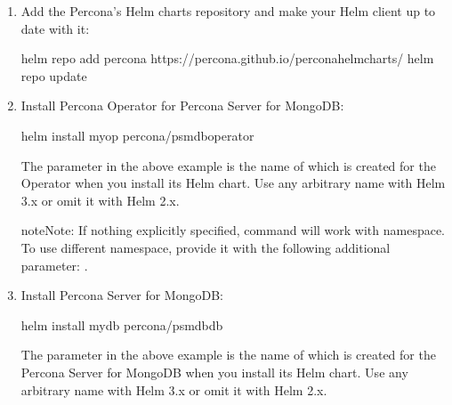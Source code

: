\documentclass[letterpaper,10pt,english]{sphinxmanual}
\begin{document}
\label{\detokenize{helm:installation}}\begin{enumerate}
%
\item {} 
Add the Percona’s Helm charts repository and make your Helm client up to
date with it:

\begin{sphinxVerbatim}[commandchars=\\\{\}]
helm repo add percona https://percona.github.io/percona\PYGZhy{}helm\PYGZhy{}charts/
helm repo update
\end{sphinxVerbatim}

\item {} 
Install Percona Operator for Percona Server for MongoDB:

\begin{sphinxVerbatim}[commandchars=\\\{\}]
helm install my\PYGZhy{}op percona/psmdb\PYGZhy{}operator
\end{sphinxVerbatim}

The  parameter in the above example is the name of 
which is created for the Operator when you install its Helm chart. Use any
arbitrary name with Helm 3.x or omit it with Helm 2.x.

\begin{sphinxadmonition}{note}{Note:}
If nothing explicitly specified,  command will work
with  namespace. To use different namespace, provide it with
the following additional parameter: .
\end{sphinxadmonition}

\item {} 
Install Percona Server for MongoDB:

\begin{sphinxVerbatim}[commandchars=\\\{\}]
helm install my\PYGZhy{}db percona/psmdb\PYGZhy{}db
\end{sphinxVerbatim}

The  parameter in the above example is the name of 
which is created for the Percona Server for MongoDB when you install its Helm
chart. Use any arbitrary name with Helm 3.x or omit it with Helm 2.x.

\end{enumerate}
\end{document}
